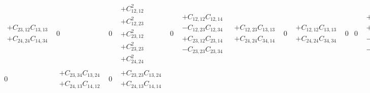 \documentclass[pra,nofootinbib]{revtex4-1}
\newcommand{\C}[2]{C_{{#1},{#2}}}
\begin{document}
\begin{eqnarray}
\begin{array}{cccccccccccccccc}
\begin{array}{c}
     + \C{23}{12}\C{13}{13} \\
     + \C{24}{24}\C{14}{34}
     \end{array} &
     0 &
     0 &
     \begin{array}{c}
     + \C{12}{12}^2 \\
     + \C{12}{23}^2 \\
     + \C{23}{12}^2 \\
     + \C{23}{23}^2 \\
     + \C{24}{24}^2
     \end{array} &
     0 &
     \begin{array}{c}
     + \C{12}{12}\C{12}{14} \\
     - \C{12}{23}\C{12}{34} \\
     + \C{23}{12}\C{23}{14} \\
     - \C{23}{23}\C{23}{34}
     \end{array} &
     \begin{array}{c}
     + \C{12}{23}\C{13}{13} \\
     + \C{24}{24}\C{34}{14}
     \end{array} &
     0 &
     \begin{array}{c}
     + \C{12}{12}\C{13}{13} \\
     + \C{24}{24}\C{34}{34}
     \end{array} &
     0 &
     0 &
     \begin{array}{c}
     + \C{12}{12}\C{14}{12} \\
     + \C{12}{23}\C{14}{23} \\
     - \C{23}{12}\C{34}{12} \\
     - \C{23}{23}\C{34}{23}
     \end{array} &
     0 &
     \begin{array}{c}
     + \C{12}{12}\C{14}{14} \\
     - \C{12}{23}\C{14}{34} \\
     - \C{23}{12}\C{34}{14} \\
     + \C{23}{23}\C{34}{34}
     \end{array} \\
     0 &
     \begin{array}{c}
     + \C{23}{34}\C{13}{24} \\
     + \C{24}{13}\C{14}{12}
     \end{array} &
     0 &
     \begin{array}{c}
     + \C{23}{23}\C{13}{24} \\
     + \C{24}{13}\C{14}{14}
     \end{array} &

\end{array}
\end{eqnarray}
\end{document}
